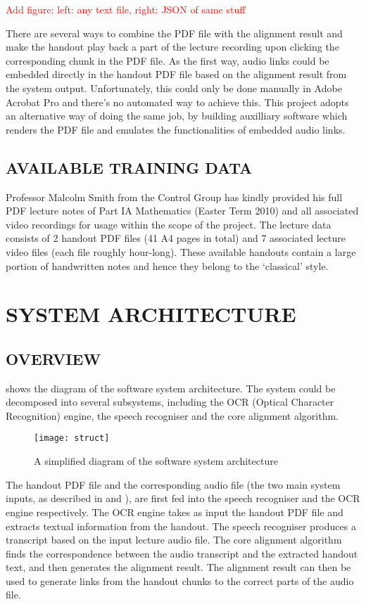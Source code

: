 \documentclass[12pt]{article}
\begin{document}
\textcolor{red}{Add figure: left: any text file, right: JSON of same stuff}

There are several ways to combine the PDF file with the alignment result and make the handout play back a part of the lecture recording upon clicking the corresponding chunk in the PDF file. As the first way, audio links could be embedded directly in the handout PDF file based on the alignment result from the system output. Unfortunately, this could only be done manually in Adobe Acrobat Pro and there's no automated way to achieve this. This project adopts an alternative way of doing the same job, by building auxilliary software which renders the PDF file and emulates the functionalities of embedded audio links.

\subsection{AVAILABLE TRAINING DATA}

Professor Malcolm Smith from the Control Group has kindly provided his full PDF lecture notes of Part IA Mathematics (Easter Term 2010) and all associated video recordings for usage within the scope of the project. The lecture data consists of 2 handout PDF files (41 A4 pages in total) and 7 associated lecture video files (each file roughly hour-long). These available handouts contain a large portion of handwritten notes and hence they belong to the `classical' style.


\section{SYSTEM ARCHITECTURE}

\subsection{OVERVIEW}

 shows the diagram of the software system architecture. The system could be decomposed into several subsystems, including the OCR (Optical Character Recognition) engine, the speech recogniser and the core alignment algorithm.

\begin{figure}[!ht]
    \centering
    \texttt{[image: struct]}
    \caption{A simplified diagram of the software system architecture}
    \label{fig:struct}
\end{figure}

The handout PDF file and the corresponding audio file (the two main system inputs, as described in  and ), are first fed into the speech recogniser and the OCR engine respectively. The OCR engine takes as input the handout PDF file and extracts textual information from the handout. The speech recogniser produces a transcript based on the input lecture audio file. The core alignment algorithm finds the correspondence between the audio transcript and the extracted handout text, and then generates the alignment result. The alignment result can then be used to generate links from the handout chunks to the correct parts of the audio file.
\end{document}
